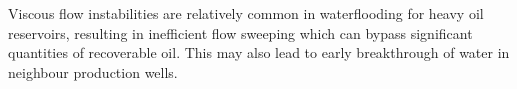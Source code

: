 \documentclass[preprint,authoryear,12pt]{elsarticle}
\newcommand{\ie}{{\it i.e., }}
\begin{document}




Viscous flow instabilities are relatively common in waterflooding for heavy oil reservoirs, resulting in inefficient flow sweeping which can bypass significant quantities of recoverable oil. This may also lead to early breakthrough of water in neighbour production wells.
\end{document}

